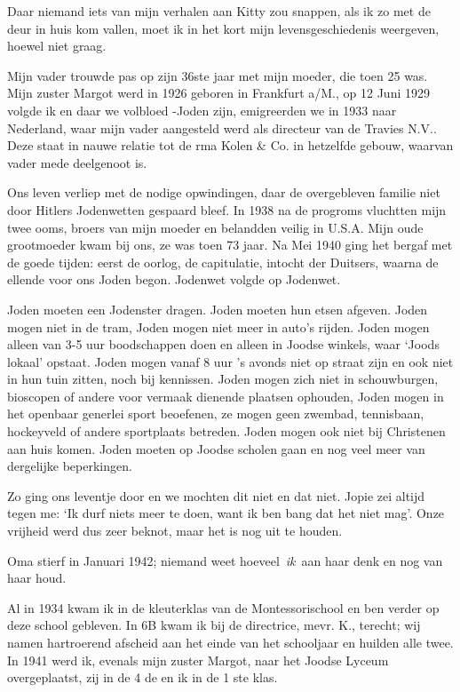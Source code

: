 \documentclass{book}
\begin{document}
Daar niemand iets van mijn verhalen aan Kitty zou snappen, als ik zo met
de deur in huis kom vallen, moet ik in het kort mijn levensgeschiedenis
weergeven, hoewel niet graag.

Mijn vader trouwde pas op zijn 36ste jaar met mijn moeder, die toen 25
was. Mijn zuster Margot werd in 1926 geboren in Frankfurt a/M., op 12
Juni 1929 volgde ik en daar we volbloed -Joden zijn, emigreerden we in
1933 naar Nederland, waar mijn vader aangesteld werd als directeur van
de Travies N.V.. Deze staat in nauwe relatie tot de rma Kolen \& Co. in
hetzelfde gebouw, waarvan vader mede deelgenoot is.

Ons leven verliep met de nodige opwindingen, daar de overgebleven
familie niet door Hitlers Jodenwetten gespaard bleef. In 1938 na de
progroms vluchtten mijn twee ooms, broers van mijn moeder en belandden
veilig in U.S.A. Mijn oude grootmoeder kwam bij ons, ze was toen 73
jaar. Na Mei 1940 ging het bergaf met de goede tijden: eerst de oorlog,
de capitulatie, intocht der Duitsers, waarna de ellende voor ons Joden
begon. Jodenwet volgde op Jodenwet.

Joden moeten een Jodenster dragen. Joden moeten hun etsen afgeven. Joden
mogen niet in de tram, Joden mogen niet meer in auto's rijden. Joden
mogen alleen van 3-5 uur boodschappen doen en alleen in Joodse winkels,
waar `Joods lokaal' opstaat. Joden mogen vanaf 8 uur 's avonds niet op
straat zijn en ook niet in hun tuin zitten, noch bij kennissen. Joden
mogen zich niet in schouwburgen, bioscopen of andere voor vermaak
dienende plaatsen ophouden, Joden mogen in het openbaar generlei sport
beoefenen, ze mogen geen zwembad, tennisbaan, hockeyveld of andere
sportplaats betreden. Joden mogen ook niet bij Christenen aan huis
komen. Joden moeten op Joodse scholen gaan en nog veel meer van
dergelijke beperkingen.

Zo ging ons leventje door en we mochten dit niet en dat niet. Jopie zei
altijd tegen me: `Ik durf niets meer te doen, want ik ben bang dat het
niet mag'. Onze vrijheid werd dus zeer beknot, maar het is nog uit te
houden.

Oma stierf in Januari 1942; niemand weet hoeveel~\emph{ik}~aan haar denk
en nog van haar houd.

Al in 1934 kwam ik in de kleuterklas van de Montessorischool en ben
verder op deze school gebleven. In 6B kwam ik bij de directrice, mevr.
K., terecht; wij namen hartroerend afscheid aan het einde van het
schooljaar en huilden alle twee. In 1941 werd ik, evenals mijn zuster
Margot, naar het Joodse Lyceum overgeplaatst, zij in de 4 de en ik in de
1 ste klas.
\end{document}
